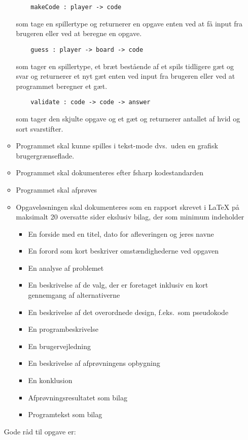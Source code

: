 \documentclass[a4paper,12pt]{article}
\begin{document}
\begin{enumerate}[label=8g.\arabic*,start=0]
\begin{itemize}
  \begin{lstlisting}
    makeCode : player -> code
  \end{lstlisting}
  som tage en spillertype og returnerer en opgave enten ved at få input fra brugeren eller ved at beregne en opgave.
  \begin{lstlisting}
    guess : player -> board -> code
  \end{lstlisting}
  som tager en spillertype, et bræt bestående af et spils tidligere gæt og svar og returnerer et nyt gæt enten ved input fra brugeren eller ved at programmet beregner et gæt.
  \begin{lstlisting}
    validate : code -> code -> answer
  \end{lstlisting}
  som tager den skjulte opgave og et gæt og returnerer antallet af hvid og sort svarstifter.
\item Programmet skal kunne spilles i tekst-mode dvs.\ uden en grafisk brugergrænseflade.
\item Programmet skal dokumenteres efter fsharp kodestandarden
\item Programmet skal afprøves
  \item Opgaveløsningen skal dokumenteres som en rapport skrevet i LaTeX på maksimalt 20 oversatte sider ekslusiv bilag, der som minimum indeholder
    \begin{itemize}
    \item En forside med en titel, dato for afleveringen og jeres navne
    \item En forord som kort beskriver omstændighederne ved opgaven
    \item En analyse af problemet
    \item En beskrivelse af de valg, der er foretaget inklusiv en kort gennemgang af alternativerne
    \item En beskrivelse af det overordnede design, f.eks.\ som pseudokode
    \item En programbeskrivelse
    \item En brugervejledning
    \item En beskrivelse af afprøvningens opbygning
    \item En konklusion
    \item Afprøvningsresultatet som bilag
    \item Programtekst som bilag
    \end{itemize}
  \end{itemize}
  Gode råd til opgave er:
  \begin{itemize}

\end{itemize}
\end{enumerate}
\end{document}
